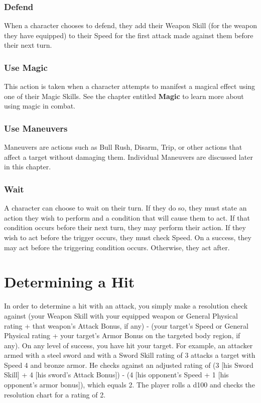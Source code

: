 \documentclass[oneside]{book}
\begin{document}
\begin{multicols}{2}
\subsubsection{Defend}
When a character chooses to defend, they add their Weapon Skill (for the weapon they have equipped) to their Speed for the first attack made against them before their next turn. 

\subsubsection{Use Magic}
This action is taken when a character attempts to manifest a magical effect using one of their Magic Skills. See the chapter entitled \textbf{Magic} to learn more about using magic in combat.

\subsubsection{Use Maneuvers}
Maneuvers are actions such as Bull Rush, Disarm, Trip, or other actions that affect a target without damaging them. Individual Maneuvers are discussed later in this chapter. 

\subsubsection{Wait}
A character can choose to wait on their turn. If they do so, they must state an action they wish to perform and a condition that will cause them to act. If that condition occurs before their next turn, they may perform their action. If they wish to act before the trigger occurs, they must check Speed. On a success, they may act before the triggering condition occurs. Otherwise, they act after.

\section{Determining a Hit}
In order to determine a hit with an attack, you simply make a resolution check against (your Weapon Skill with your equipped weapon or General Physical rating + that weapon's Attack Bonus, if any) - (your target's Speed or General Physical rating + your target's Armor Bonus on the targeted body region, if any). On any level of success, you have hit your target. For example, an attacker armed with a steel sword and with a Sword Skill rating of 3 attacks a target with Speed 4 and bronze armor. He checks against an adjusted rating of (3 [his Sword Skill] + 4 [his sword's Attack Bonus]) - (4 [his opponent's Speed + 1 [his opponent's armor bonus]), which equals 2. The player rolls a d100 and checks the resolution chart for a rating of 2.


\end{multicols}
\end{document}
